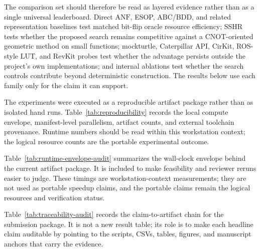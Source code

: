 \documentclass[11pt]{article}
\newcommand{\anf}{\ensuremath{\mathrm{ANF}}}
\begin{document}
The comparison set should therefore be read as layered evidence rather than as
a single universal leaderboard.  Direct \anf{}, ESOP, ABC/BDD, and related
representation baselines test matched bit-flip oracle resource efficiency;
SSHR tests whether the proposed search remains competitive against a
CNOT-oriented geometric method on small functions; mockturtle, Caterpillar API,
CirKit, ROS-style LUT, and RevKit probes test whether the advantage persists outside
the project's own implementations; and internal ablations test whether the
search controls contribute beyond deterministic construction.  The results
below use each family only for the claim it can support.

The experiments were executed as a reproducible artifact package rather than
as isolated hand runs.  Table~\ref{tab:reproducibility} records the local
compute envelope, manifest-level parallelism, artifact counts, and external
toolchain provenance.  Runtime numbers should be read within this workstation
context; the logical resource counts are the portable experimental outcome.

\begin{table}[H]
\centering
\scriptsize
\setlength{\tabcolsep}{3pt}
\renewcommand{\arraystretch}{1.08}
\caption{Compute and reproducibility audit.  The table documents the
workstation, parallel-run manifests, artifact coverage, and external-tool
commits used by the current submission package.}
\label{tab:reproducibility}

\end{table}

Table~\ref{tab:runtime-envelope-audit} summarizes the wall-clock envelope
behind the current artifact package.  It is included to make feasibility and
reviewer reruns easier to judge.  These timings are workstation-context
measurements; they are not used as portable speedup claims, and the portable
claims remain the logical resources and verification status.

\begin{table}[H]
\centering
\scriptsize
\setlength{\tabcolsep}{2pt}
\renewcommand{\arraystretch}{1.06}
\caption{Runtime-envelope audit over existing raw CSV artifacts.  Rows report
the checked subset, successful rows, and workstation wall-clock summaries used
to bound the feasibility of the submitted experiments.}
\label{tab:runtime-envelope-audit}

\end{table}

Table~\ref{tab:traceability-audit} records the claim-to-artifact chain for the
submission package.  It is not a new result table; its role is to make each
headline claim auditable by pointing to the scripts, CSVs, tables, figures, and
manuscript anchors that carry the evidence.
\end{document}
